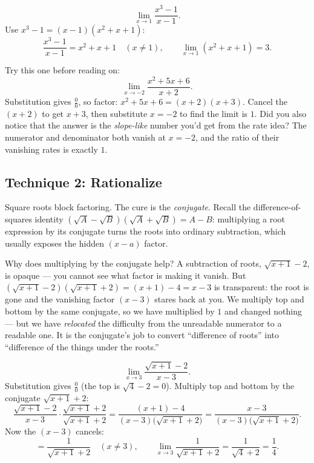 \begin{example}
\label{ch07:ex-factor3}
\[
  \lim_{x\to 1}\frac{x^{3}-1}{x-1}.
\]
Use $x^{3}-1 = (x-1)(x^{2}+x+1)$:
\[
  \frac{x^{3}-1}{x-1} = x^{2}+x+1 \quad (x\neq 1),
  \qquad
  \lim_{x\to 1}(x^{2}+x+1) = 3.
\]
\end{example}

\begin{labbox}
Try this one before reading on:
\[
  \lim_{x\to -2}\frac{x^{2}+5x+6}{x+2}.
\]
Substitution gives $\frac{0}{0}$, so factor: $x^{2}+5x+6=(x+2)(x+3)$. Cancel
the $(x+2)$ to get $x+3$, then substitute $x=-2$ to find the limit is $1$. Did
you also notice that the answer is the \emph{slope-like} number you'd get from
the rate idea? The numerator and denominator both vanish at $x=-2$, and the
ratio of their vanishing rates is exactly $1$.
\end{labbox}

\subsection{Technique 2: Rationalize}
\label{ch07:rationalize}

Square roots block factoring. The cure is the \emph{conjugate}. Recall the
difference-of-squares identity $(\sqrt{A}-\sqrt{B})(\sqrt{A}+\sqrt{B}) = A-B$:
multiplying a root expression by its conjugate turns the roots into ordinary
subtraction, which usually exposes the hidden $(x-a)$ factor.

\begin{whybox}
Why does multiplying by the conjugate help? A subtraction of roots,
$\sqrt{x+1}-2$, is opaque --- you cannot see what factor is making it vanish.
But $(\sqrt{x+1}-2)(\sqrt{x+1}+2) = (x+1)-4 = x-3$ is transparent: the root is
gone and the vanishing factor $(x-3)$ stares back at you. We multiply top and
bottom by the same conjugate, so we have multiplied by $1$ and changed
nothing --- but we have \emph{relocated} the difficulty from the unreadable
numerator to a readable one. It is the conjugate's job to convert
``difference of roots'' into ``difference of the things under the roots.''
\end{whybox}

\begin{example}
\label{ch07:ex-rat1}
\[
  \lim_{x\to 3}\frac{\sqrt{x+1}-2}{x-3}.
\]
Substitution gives $\frac{0}{0}$ (the top is $\sqrt4-2=0$). Multiply top and
bottom by the conjugate $\sqrt{x+1}+2$:
\[
  \frac{\sqrt{x+1}-2}{x-3}\cdot\frac{\sqrt{x+1}+2}{\sqrt{x+1}+2}
  = \frac{(x+1)-4}{(x-3)\big(\sqrt{x+1}+2\big)}
  = \frac{x-3}{(x-3)\big(\sqrt{x+1}+2\big)}.
\]
Now the $(x-3)$ cancels:
\[
  = \frac{1}{\sqrt{x+1}+2}
  \quad (x\neq 3),
  \qquad
  \lim_{x\to 3}\frac{1}{\sqrt{x+1}+2} = \frac{1}{\sqrt4+2} = \frac14.
\]
\end{example}

